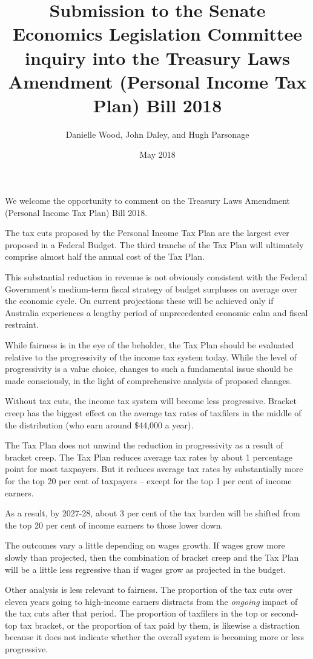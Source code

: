 \documentclass[submission]{grattan}\usepackage[]{graphicx}\usepackage[]{color}
\date{May 2018}
\title{Submission to the Senate Economics Legislation Committee inquiry into the Treasury Laws Amendment (Personal Income Tax Plan) Bill 2018}
\author{Danielle Wood, John Daley, and Hugh Parsonage}
\begin{document}
\begin{summary}

We welcome the opportunity to comment on the Treasury Laws Amendment (Personal Income Tax Plan) Bill 2018.

The tax cuts proposed by the Personal Income Tax Plan are the largest ever proposed in a Federal Budget. The third tranche of the Tax Plan will ultimately comprise almost half the annual cost of the Tax Plan.

This substantial reduction in revenue is not obviously consistent with the Federal Government's medium-term fiscal strategy of budget surpluses on average over the economic cycle. On current projections these will be achieved only if Australia experiences a lengthy period of unprecedented economic calm and fiscal restraint.

While fairness is in the eye of the beholder, the Tax Plan should be evaluated relative to the progressivity of the income tax system today. While the level of progressivity is a value choice, changes to such a fundamental issue should be made consciously, in the light of comprehensive analysis of proposed changes.

Without tax cuts, the income tax system will become less progressive. Bracket creep has the biggest effect on the average tax rates of taxfilers in the middle of the distribution (who earn around \$44,000 a year). 

The Tax Plan does not unwind the reduction in progressivity as a result of bracket creep. The Tax Plan reduces average tax rates by about 1 percentage point for most taxpayers. But it reduces average tax rates by substantially more for the top 20 per cent of taxpayers -- except for the top 1 per cent of income earners.

As a result, by 2027-28, about 3 per cent of the tax burden will be shifted from the top 20 per cent of income earners to those lower down.

The outcomes vary a little depending on wages growth. If wages grow more slowly than projected, then the combination of bracket creep and the Tax Plan will be a little less regressive than if wages grow as projected in the budget.

Other analysis is less relevant to fairness. The proportion of the tax cuts over eleven years going to high-income earners distracts from the \emph{ongoing} impact of the tax cuts after that period. The proportion of taxfilers in the top or second-top tax bracket, or the proportion of tax paid by them, is likewise a distraction because it does not indicate whether the overall system is becoming more or less progressive.
\end{summary}
\end{document}
